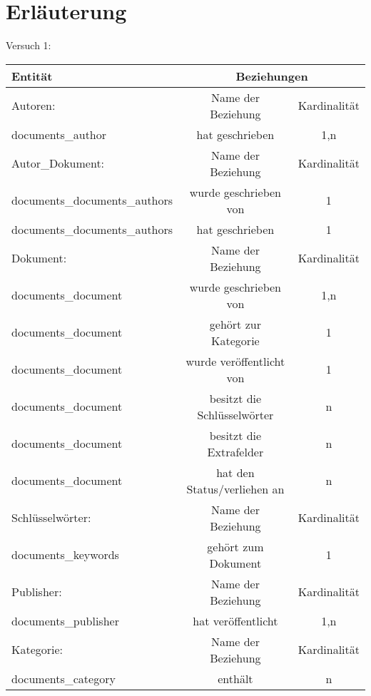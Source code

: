 \section{Erl\"auterung}
Versuch 1: \\
\begin{tabular}[ht]{|l||c|c|}
  \hline
  Entit\"at & \multicolumn{2}{c|}{Beziehungen} \\
  \hline\hline\hline
  
  Autoren:  & Name der Beziehung &  Kardinalit\"at\\
  \hline\hline
  documents\_author & hat geschrieben & 1,n \\
  \hline\hline\hline
  
  Autor\_Dokument: & Name der Beziehung & Kardinalität\\
  \hline\hline
  documents\_documents\_authors & wurde geschrieben von & 1\\
  \hline
  documents\_documents\_authors & hat geschrieben & 1\\
  \hline\hline\hline
  
  Dokument: & Name der Beziehung & Kardinalität\\
  \hline\hline
  documents\_document & wurde geschrieben von & 1,n\\
  \hline
  documents\_document & gehört zur Kategorie & 1\\
  \hline
  documents\_document & wurde veröffentlicht von & 1\\
  \hline
  documents\_document & besitzt die Schlüsselwörter & n\\  
  \hline
  documents\_document & besitzt die Extrafelder & n\\
  \hline
  documents\_document & hat den Status/verliehen an & n\\
  \hline\hline\hline
  
  Schlüsselwörter:  & Name der Beziehung &  Kardinalit\"at\\
  \hline\hline
  documents\_keywords & gehört zum Dokument & 1 \\
  \hline\hline\hline
  
  Publisher:  & Name der Beziehung &  Kardinalit\"at\\
  \hline\hline
  documents\_publisher & hat veröffentlicht & 1,n \\
  \hline\hline\hline
  
  Kategorie:  & Name der Beziehung &  Kardinalit\"at\\
  \hline\hline
  documents\_category & enthält & n \\
  \hline\hline\hline
  

\end{tabular}
